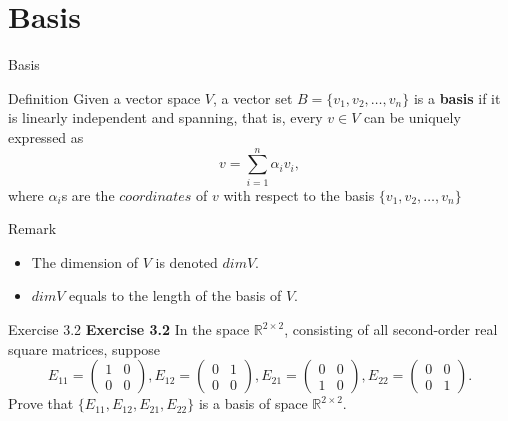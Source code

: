 \documentclass{beamer}
\begin{document}
\section{Basis}
\begin{frame}[label=2]{Basis}
        \begin{block}{Definition}
        Given a vector space $V$, a vector set $B=\{v_1,v_2,\dots, v_n\}$ is a \textbf{basis} if it is linearly independent and spanning, that is, every $v\in V$ can be uniquely expressed as 
        \begin{equation*}
            v=\sum_{i=1}^n\alpha_iv_i,
        \end{equation*}
        where $\alpha_i$s are the $coordinates$ of $v$ with respect to the basis $\{v_1,v_2,\dots, v_n\}$
        \end{block}

        \begin{block}{Remark}
            \begin{itemize}
                \item The dimension of $V$ is denoted $dim V$.
                \item $dim V$ equals to the length of the basis of $V$.
            \end{itemize}
        \end{block}
\end{frame}

\begin{frame}{Exercise 3.2}
    \textbf{Exercise 3.2} In the space $\mathbb{R}^{2\times2}$, consisting of all second-order real square matrices, suppose
    \begin{equation*}
        E_{11}=\begin{pmatrix}
            1&0\\0&0
        \end{pmatrix},
        E_{12}=\begin{pmatrix}
            0&1\\0&0
        \end{pmatrix},
        E_{21}=\begin{pmatrix}
            0&0\\1&0
        \end{pmatrix},
        E_{22}=\begin{pmatrix}
            0&0\\0&1
        \end{pmatrix}.
    \end{equation*}
    Prove that $\{E_{11},E_{12},E_{21},E_{22}\}$ is a basis of space $\mathbb{R}^{2\times2}$.
\end{frame}
\end{document}
